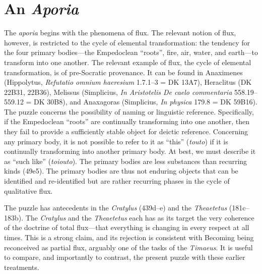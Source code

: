 
\section{An \emph{Aporia}} %
\label{sec:an_emph_aporia}

The \emph{aporia} begins with the phenomena of flux. The relevant notion of flux, however, is restricted to the cycle of elemental transformation: the tendency for the four primary bodies---the Empedoclean ``roots'', fire, air, water, and earth---to transform into one another. The relevant example of flux, the cycle of elemental transformation, is of pre-Socratic provenance. It can be found in Anaximenes (Hippolytus, \emph{Refutatio omnium haeresium} 1.7.1--3 = DK 13A7), Heraclitus (DK 22B31, 22B36), Melissus (Simplicius, \emph{In Aristotelis De caelo commentaria} 558.19--559.12 = DK 30B8), and Anaxagoras (Simplicius, \emph{In physica} 179.8 = DK 59B16). The puzzle concerns the possibility of naming or linguistic reference. Specifically, if the Empedoclean ``roots'' are continually transforming into one another, then they fail to provide a sufficiently stable object for deictic reference. Concerning any primary body, it is not possible to refer to it as ``this'' (\emph{touto}) if it is continually transforming into another primary body. At best, we must describe it as ``such like'' (\emph{toiouto}). The primary bodies are less substances than recurring kinds (49e5). The primary bodies are thus not enduring objects that can be identified and re-identified but are rather recurring phases in the cycle of qualitative flux.

The puzzle has antecedents in the \emph{Cratylus} (439d--e) and the \emph{Theaetetus} (181c--183b). The \emph{Cratylus} and the \emph{Theaetetus} each has as its target the very coherence of the doctrine of total flux---that everything is changing in every respect at all times. This is a strong claim, and its rejection is consistent with Becoming being reconceived as partial flux, arguably one of the tasks of the \emph{Timaeus}. It is useful to compare, and importantly to contrast, the present puzzle with these earlier treatments. 

